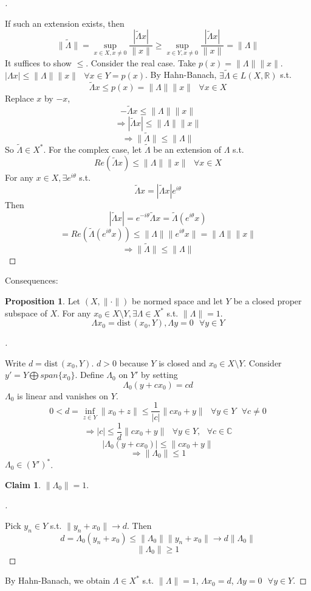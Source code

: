 \documentclass{article}
\theoremstyle{definition}
\newtheorem{prop}{Proposition}
\newtheorem*{clm}{Claim}
\newenvironment{proofs}[1][\proofname]{%
  \begin{proof}[#1]$ $\par\nobreak\ignorespaces
}{%
  \end{proof}
}
\newcommand{\sfa}{\text{  } \forall}
\newcommand{\dist}{\text{dist}\,}
\begin{document}
\begin{proofs}
	If such an extension exists, then
	\[
		\|\tilde{\Lambda} \| = \sup_{x \in X, x \neq 0} \frac{|\tilde{\Lambda} x|}{\|x\|} \geq \sup_{x \in Y, x \neq 0} \frac{|\tilde{\Lambda} x|}{\|x\|} = \|\Lambda\|
	\]
	It suffices to show $\leq$.
	Consider the real case.
	Take $p(x) = \| \Lambda \| \| x \|$.
	$|\Lambda x| \leq \| \Lambda \| \| x \| \sfa x \in Y = p(x) $.
	By Hahn-Banach, $\exists \tilde{\Lambda} \in L(X, \mathbb{R})$ s.t.
	\[
		\tilde{\Lambda} x \leq p(x) = \| \Lambda \| \|x \| \sfa x \in X 
	\]
	Replace $x$ by $-x$,
	\[
		-\tilde{\Lambda} x \leq \| \Lambda \| \| x \|
	\]
	\[
		\Rightarrow | \tilde{\Lambda} x | \leq \| \Lambda \| \| x \|
	\]
	\[
		\Rightarrow \|\tilde{\Lambda} \| \leq \| \Lambda \|
	\]
	So $\tilde{\Lambda} \in X^*$.
	For the complex case, let $\tilde{\Lambda}$ be an extension of $\Lambda$ s.t.
	\[
		Re(\tilde{\Lambda} x) \leq \| \Lambda \| \|x \| \sfa x \in X
	\]
	For any $x \in X, \exists e^{i \theta}$ s.t.
	\[
		\tilde{\Lambda} x = |\tilde{\Lambda} x| e^{i \theta}
	\]
	Then 
	\[
		|\tilde{\Lambda} x| = e^{-i \theta} \tilde{\Lambda} x = \tilde{\Lambda} (e^{i \theta} x)
	\]
	\[
		= Re(\tilde{\Lambda} (e^{i \theta} x)) \leq \|\Lambda \| \| e^{i \theta} x \| = \| \Lambda \| \|x \|
	\]
	\[
		\Rightarrow \| \tilde{\Lambda} \| \leq  \| \Lambda \|
	\]

\end{proofs}

Consequences:

\begin{prop}
	Let $(X, \|\cdot \|)$ be normed space and let $Y$ be a closed proper subspace of $X$.
	For any $x_0 \in X \setminus Y, \exists \Lambda \in X^*$ s.t. $\| \Lambda \| = 1$.
	\[
		\Lambda x_0 = \dist(x_0, Y), \Lambda y = 0 \sfa y \in Y
	\]
\end{prop}

\begin{proofs}
	Write $d = \dist(x_0, Y)$.
	$d > 0$ because $Y$ is closed and $x_0 \in X \setminus Y$.
	Consider $y' = Y \bigoplus span\{x_0 \}$.
	Define $\Lambda_0$ on $Y'$ by setting 
	\[
		\Lambda_0(y + c x_0) = cd
	\]
	$\Lambda_0$ is linear and vanishes on $Y$.
	\[
		0 < d = \inf_{z \in Y} \|x_0 + z \| \leq \frac{1}{|c|} \|c x_0 + y \| \sfa y \in Y \sfa c \neq 0
	\]
	\[
		\Rightarrow |c| \leq \frac{1}{d} \|c x_0 + y \| \sfa y \in Y , \sfa c \in \mathbb{C}
	\]
	\[
		|\Lambda_0(y + c x_0)| \leq \|c x_0 + y \|
	\]
	\[
		\Rightarrow \|\Lambda_0\| \leq 1
	\]
	$\Lambda_0 \in (Y')^*$.
	\begin{clm}
		$\|\Lambda_0 \| = 1$.
	\end{clm}

	\begin{proofs}
		Pick $y_n \in Y$ s.t. $\|y_n + x_0 \| \to d$.
		Then 
		\[
			d = \Lambda_0 (y_n + x_0) \leq \| \Lambda_0 \| \|y_n + x_0 \| \to d \|\Lambda_0 \|
		\]
		\[
			\| \Lambda_0 \| \geq 1
		\]
	\end{proofs}
	By Hahn-Banach, we obtain $\Lambda \in X^*$ s.t. $\|\Lambda \| = 1$, $\Lambda x_0 = d$, $\Lambda y = 0 \sfa y \in Y$.
\end{proofs}
\end{document}
